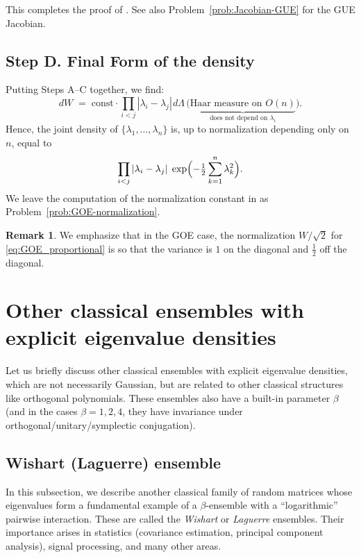 \documentclass[letterpaper,11pt,oneside,reqno]{article}
\numberwithin{equation}{section}
\newcommand{\ssp}{\hspace{1pt}}
\theoremstyle{definition}
\newtheorem{remark}[proposition]{Remark}
\begin{document}
This completes the proof of
.
See also Problem~\ref{prob:Jacobian-GUE} for the GUE Jacobian.

\subsection{Step D. Final Form of the density}
\label{subsec:final-form}

Putting Steps A--C together, we find:
\[
  dW
  \;=\;
	\mathrm{const}\cdot
  \prod_{i<j}|\lambda_i-\lambda_j|\ssp
  d\Lambda
  \,\bigl(\underbrace{\text{Haar measure on }O(n)}_{\text{does not depend on }\lambda_i}\bigr).
\]
Hence, the joint density of \(\{\lambda_1,\dots,\lambda_n\}\) is,
up to normalization depending only on \(n\), equal to
\begin{equation}
	\label{eq:GOE_proportional}
  \prod_{i<j}|\lambda_i-\lambda_j|\;
  \exp\Bigl(-\tfrac{1}{2}\sum_{k=1}^n \lambda_k^2\Bigr).
\end{equation}
We leave the computation of the normalization constant in
 as Problem~\ref{prob:GOE-normalization}.

\begin{remark}
	We emphasize that in the GOE case, the normalization $W/\sqrt 2$ for
	\eqref{eq:GOE_proportional}
	is so that the variance is $1$ on the diagonal and
	$\frac{1}{2}$ off the diagonal.
\end{remark}

\section{Other classical ensembles with explicit eigenvalue densities}
\label{sec:other-ensembles}

Let us briefly discuss other classical ensembles with explicit eigenvalue densities,
which are not necessarily Gaussian,
but are related to other classical structures
like orthogonal polynomials. These ensembles
also have
a built-in parameter $\beta$ (and in the cases $\beta=1,2,4$, they have
invariance under orthogonal/unitary/symplectic conjugation).


\subsection{Wishart (Laguerre) ensemble}
\label{sec:Wishart}

In this subsection, we describe another classical family of random matrices whose eigenvalues form a fundamental example of a $\beta$-ensemble with a ``logarithmic'' pairwise interaction. These are called the \emph{Wishart} or \emph{Laguerre} ensembles. Their importance arises in statistics (covariance estimation, principal component analysis), signal processing, and many other areas.
\end{document}
